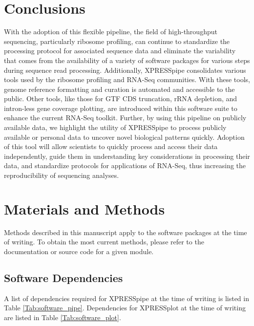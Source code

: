 \documentclass[10pt, oneside]{article}
\begin{document}
\begin{multicols}{2}
\section*{Conclusions}
With the adoption of this flexible pipeline, the field of high-throughput sequencing, particularly ribosome profiling, can continue to standardize the processing protocol for associated sequence data and eliminate the variability that comes from the availability of a variety of software packages for various steps during sequence read processing. Additionally, XPRESSpipe consolidates various tools used by the ribosome profiling and RNA-Seq communities. With these tools, genome reference formatting and curation is automated and accessible to the public. Other tools, like those for GTF CDS truncation, rRNA depletion, and intron-less gene coverage plotting, are introduced within this software suite to enhance the current RNA-Seq toolkit. Further, by using this pipeline on publicly available data, we highlight the utility of XPRESSpipe to process publicly available or personal data to uncover novel biological patterns quickly. Adoption of this tool will allow scientists to quickly process and access their data independently, guide them in understanding key considerations in processing their data, and standardize protocols for applications of RNA-Seq, thus increasing the reproducibility of sequencing analyses.


\section*{Materials and Methods}
Methods described in this manuscript apply to the software packages at the time of writing. To obtain the most current methods, please refer to the documentation or source code for a given module.

\subsection*{Software Dependencies}
A list of dependencies required for XPRESSpipe at the time of writing is listed in Table \ref{Tab:software_pipe}. Dependencies for XPRESSplot at the time of writing are listed in Table \ref{Tab:software_plot}.


\end{multicols}
\end{document}
